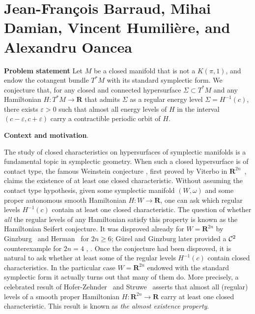 \documentclass[11pt]{article}
\theoremstyle{definition}
\begin{document}
\section*{Jean-Fran\c{c}ois Barraud, Mihai Damian, Vincent Humilière, and Alexandru Oancea}

\textbf{Problem statement} Let $M$ be a closed manifold that is not a $K(\pi,1)$, and endow the cotangent bundle $T^*M$ with its standard symplectic form. We conjecture that, for any closed and connected hypersurface $\Sigma\subset T^*M$ and any Hamiltonian $H:T^*M\to\mathbf{R}$ that admits $\Sigma$ as a regular energy level $\Sigma=H^{-1}(c)$, there exists $\varepsilon>0$ such that almost all energy levels of $H$ in the interval $(c-\varepsilon,c+\varepsilon)$ carry a contractible periodic orbit of $H$.    
 
\textbf{Context and motivation}. 

The study of closed characteristics on hypersurfaces of symplectic manifolds is a fundamental topic in symplectic geometry. When such a closed hypersurface is of contact type, the famous Weinstein conjecture \cite{Weinstein79}, first proved by Viterbo in $\mathbf{R}^{2n}$~\cite{Viterbo-WeinsteinR2n}, claims the existence of at least one closed characteristic.  Without assuming the contact type hypothesis,  given some symplectic manifold $(W,\omega)$ and some proper autonomous smooth Hamiltonian $H:W\to \mathbf{R}$, one can ask which regular levels $H^{-1}(c)$ contain at least one closed characteristic. The question of whether {\it all} the regular levels of any Hamiltonian satisfy this property is known as the Hamiltonian Seifert conjecture. It was disproved already for $W=\mathbf{R}^{2n}$ by Ginzburg~\cite{Ginzburg-Ham-Seifert1} \cite{Ginzburg-Ham-Seifert2} and Herman~\cite{Herman} for $2n\geq6$; G\"urel and  Ginzburg later provided a ${\cal C}^2$ counterexample for $2n=4$ \cite{Ginzburg-Gurel1}, \cite{Ginzburg-Gurel2}. Once the conjecture had been disproved, it is natural to ask whether at least some of the regular levels $H^{-1}(c)$ contain closed characteristics. In the particular case $W=\mathbf{R}^{2n}$ endowed with the standard symplectic form it actually turns out that many of them do. More precisely, a celebrated result of Hofer-Zehnder~\cite{HZ} and Struwe~\cite{Struwe} asserts that almost all (regular) levels of a smooth proper Hamiltonian $H:\mathbf{R}^{2n}\to \mathbf{R}$ carry at least one closed characteristic. This result is known as {\it the almost existence property}.
\end{document}
